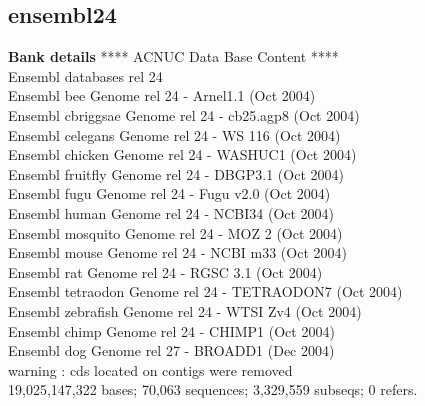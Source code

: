 \documentclass{article}
\begin{document}
\begin{Schunk}
\section{ ensembl24 }
\textbf{Bank details}
            ****     ACNUC Data Base Content      ****  \\
	     Ensembl databases rel 24\\
             Ensembl bee  Genome rel 24 - Arnel1.1 (Oct 2004)\\
             Ensembl cbriggsae  Genome rel 24 - cb25.agp8 (Oct 2004)\\
             Ensembl celegans  Genome rel 24 - WS 116 (Oct 2004)\\
             Ensembl chicken  Genome rel 24 - WASHUC1 (Oct 2004)\\
             Ensembl fruitfly  Genome rel 24 - DBGP3.1 (Oct 2004)\\
             Ensembl fugu  Genome rel 24 - Fugu v2.0 (Oct 2004)\\
             Ensembl human  Genome rel 24 - NCBI34 (Oct 2004)\\
             Ensembl mosquito  Genome rel 24 - MOZ 2 (Oct 2004)\\
             Ensembl mouse  Genome rel 24 - NCBI m33 (Oct 2004)\\
             Ensembl rat  Genome rel 24 - RGSC 3.1 (Oct 2004)\\
             Ensembl tetraodon  Genome rel 24 - TETRAODON7 (Oct 2004)\\
             Ensembl zebrafish  Genome rel 24 - WTSI Zv4 (Oct 2004)\\
             Ensembl chimp  Genome rel 24 - CHIMP1 (Oct 2004)\\
	     Ensembl dog  Genome rel 27 - BROADD1 (Dec 2004)\\
   warning : cds located on contigs were removed\\
19,025,147,322 bases; 70,063 sequences; 3,329,559 subseqs; 0 refers.


\end{Schunk}
\end{document}
